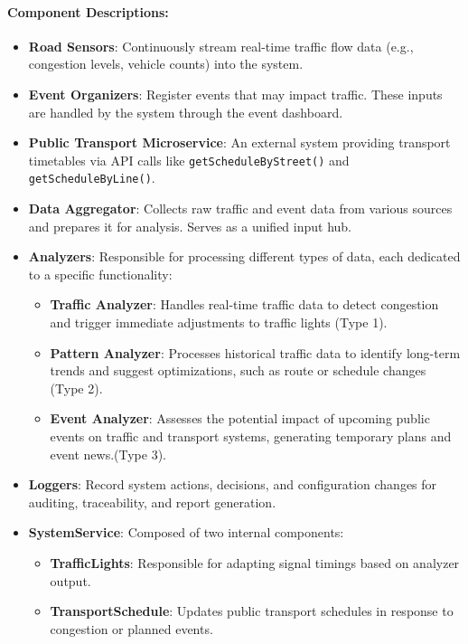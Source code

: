 \paragraph{Component Descriptions:}

\begin{itemize}
    \item \textbf{Road Sensors}: Continuously stream real-time traffic flow data (e.g., congestion levels, vehicle counts) into the system.
    
    \item \textbf{Event Organizers}: Register events that may impact traffic. These inputs are handled by the system through the event dashboard.
    
    \item \textbf{Public Transport Microservice}: An external system providing transport timetables via API calls like \texttt{getScheduleByStreet()} and \texttt{getScheduleByLine()}.
    
    \item \textbf{Data Aggregator}: Collects raw traffic and event data from various sources and prepares it for analysis. Serves as a unified input hub.
    
    \item \textbf{Analyzers}: Responsible for processing different types of data, each dedicated to a specific functionality:

\begin{itemize}
    \item \textbf{Traffic Analyzer}: Handles real-time traffic data to detect congestion and trigger immediate adjustments to traffic lights (Type 1).
    \item \textbf{Pattern Analyzer}: Processes historical traffic data to identify long-term trends and suggest optimizations, such as route or schedule changes (Type 2).
    \item \textbf{Event Analyzer}: Assesses the potential impact of upcoming public events on traffic and transport systems, generating temporary plans and event news.(Type 3).
\end{itemize}

    
    \item \textbf{Loggers}: Record system actions, decisions, and configuration changes for auditing, traceability, and report generation.
    
    \item \textbf{SystemService}: Composed of two internal components:
    \begin{itemize}
        \item \textbf{TrafficLights}: Responsible for adapting signal timings based on analyzer output.
        \item \textbf{TransportSchedule}: Updates public transport schedules in response to congestion or planned events.
    \end{itemize}


\end{itemize}
